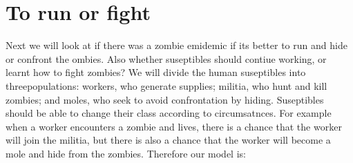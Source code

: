 \documentclass{mm2}
\numberwithin{equation}{section}
\theoremstyle{definition}
\begin{document}
\section{To run or fight}
Next we will look at if there was a zombie emidemic if its better to run and hide or confront the ombies. Also whether suseptibles should contiue working, or learnt how to fight zombies? We will divide the human suseptibles into threepopulations: workers, who generate supplies; militia, who hunt and kill zombies; and moles, who seek to avoid confrontation by hiding. \newline
Suseptibles should be able to change their class according to circumsatnces. For example when a worker encounters a zombie and lives, there is a chance that the worker will join the militia, but there is also a chance that the worker will become a mole and hide from the zombies. Therefore our model is:
\end{document}
